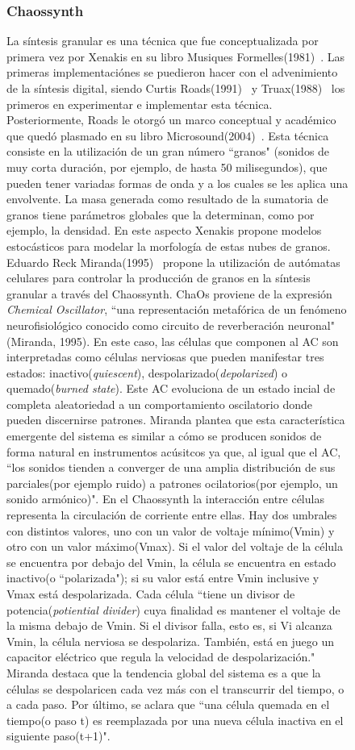 \documentclass[16pt,spanish]{article}
\begin{document}
\begin{figure}[h!]
\subsubsection{Chaossynth}
	La síntesis granular es una técnica que fue conceptualizada por primera vez por Xenakis en su libro Musiques Formelles(1981)~\cite{xenakis1981musiques}. Las primeras implementaciónes se puedieron hacer con el advenimiento de la síntesis digital, siendo Curtis Roads(1991)~\cite{roads1991asynchronous} y Truax(1988)~\cite{truax1988real} los primeros en experimentar e implementar esta técnica. Posteriormente, Roads le otorgó un marco conceptual y académico que quedó plasmado en su libro Microsound(2004)~\cite{roads2004microsound}. Esta técnica consiste en la utilización de un gran número ``granos" (sonidos de muy corta duración, por ejemplo, de hasta 50 milisegundos), que pueden tener variadas formas de onda y a los cuales se les aplica una envolvente. La masa generada como resultado de la sumatoria de granos tiene parámetros globales que la determinan, como por ejemplo, la densidad. En este aspecto Xenakis propone modelos estocásticos para modelar la morfología de estas nubes de granos. Eduardo Reck Miranda(1995)~\cite{miranda1995granular} propone la utilización de autómatas celulares para controlar la producción de granos en la síntesis granular a través del Chaossynth.
	ChaOs proviene de la expresión \textit{Chemical Oscillator}, ``una representación metafórica de un fenómeno neurofisiológico conocido como circuito de reverberación neuronal"(Miranda, 1995). En este caso, las células que componen al AC son interpretadas como células nerviosas que pueden manifestar tres estados: inactivo(\textit{quiescent}), despolarizado(\textit{depolarized}) o quemado(\textit{burned state}). Este AC evoluciona de un estado incial de completa aleatoriedad a un comportamiento oscilatorio donde pueden discernirse patrones. Miranda plantea que esta característica emergente del sistema es similar a cómo se producen sonidos de forma natural en instrumentos acúsitcos ya que, al igual que el AC, ``los sonidos tienden a converger de una amplia distribución de sus parciales(por ejemplo ruido) a patrones ocilatorios(por ejemplo, un sonido armónico)". En el Chaossynth la interacción entre células representa la circulación de corriente entre ellas. Hay dos umbrales con distintos valores, uno con un valor de voltaje mínimo(Vmin) y otro con un valor máximo(Vmax). Si el valor del voltaje de la célula se encuentra por debajo del Vmin, la célula se encuentra en estado inactivo(o ``polarizada"); si su valor está entre Vmin inclusive y Vmax está despolarizada. Cada célula ``tiene un divisor de potencia(\textit{potiential divider}) cuya finalidad es mantener el voltaje de la misma debajo de Vmin. Si el divisor falla, esto es, si Vi alcanza Vmin, la célula nerviosa se despolariza. También, está en juego un capacitor eléctrico que regula la velocidad de despolarización." Miranda destaca que la tendencia global del sistema es a que la células se despolaricen cada vez más con el transcurrir del tiempo, o a cada paso. Por último, se aclara que ``una célula quemada en el tiempo(o paso t) es reemplazada por una nueva célula inactiva en el siguiente paso(t+1)".


\end{figure}
\end{document}
